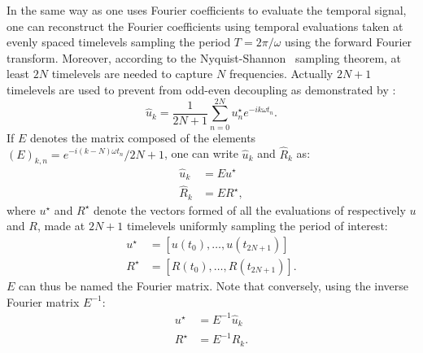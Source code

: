In the same way as one uses Fourier coefficients to
evaluate the temporal signal,
one can reconstruct the Fourier coefficients using
temporal evaluations taken at evenly spaced timelevels
sampling the period $T = 2 \pi / \omega$ using the forward
Fourier transform. Moreover, 
according to the Nyquist-Shannon~\cite{Shannon1949} sampling theorem, 
at least $2N$ timelevels are needed to capture $N$ frequencies. Actually
$2N+1$ timelevels are used to prevent from odd-even decoupling as
demonstrated by \citet{Weide2005}:
\begin{equation}
	\widehat{u}_k = \frac{1}{2N+1} 
	\sum_{n=0}^{2N} u_n^\star e^{-i k \omega t_n}.
\end{equation}
If $E$ denotes the matrix composed of the elements 
$(E)_{k,n} = e^{-i (k - N) \omega t_n} / 2N+1$, one can write $\widehat{u}_k$
and $\widehat{R}_k$ as:
\begin{equation}
	\begin{split}
		\widehat{u}_k &= E u^\star \\
		\widehat{R}_k &= E R^\star,
	\end{split}
	\label{eq:sm_matrix_fourier_operator}
\end{equation}
where $u^\star$ and $R^\star$ 
denote the vectors formed of all the evaluations of respectively $u$
and $R$,
made at $2N+1$ timelevels uniformly sampling the period of interest:
\begin{equation}
	\begin{split}
		u^\star &= [u(t_0), \ldots, u(t_{2N+1})] \\
		R^\star &= [R(t_0), \ldots, R(t_{2N+1})].
	\end{split}
\end{equation}
$E$ can thus be named the Fourier matrix.
Note that conversely, using the inverse Fourier matrix $E^{-1}$:
\begin{equation}
	\begin{split}
		u^\star &= E^{-1} \widehat{u}_k \\
		R^\star &= E^{-1} \widehat{R}_k.
	\end{split}
\end{equation}

